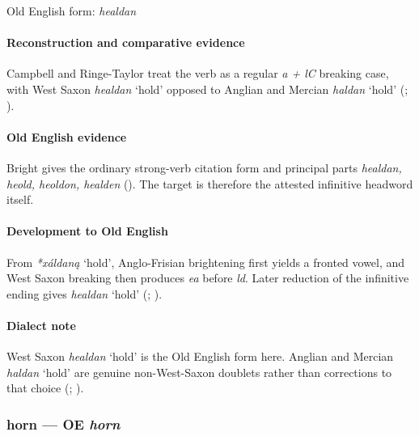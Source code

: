 \documentclass[
  british,
  a4paper,
]{article}
\providecommand{\Recon}[1]{\emph{*#1}}
\begin{document}
Old English form: \emph{healdan}

\paragraph{Reconstruction and comparative
evidence}\label{reconstruction-and-comparative-evidence-34}

Campbell and Ringe-Taylor treat the verb as a regular \emph{a + lC}
breaking case, with West Saxon {\emph{healdan}} `hold' opposed to
Anglian and Mercian {\emph{haldan}} `hold'
(;
).

\paragraph{Old English evidence}\label{old-english-evidence-34}

Bright gives the ordinary strong-verb citation form and principal parts
\emph{healdan, heold, heoldon, healden}
(). The target is
therefore the attested infinitive headword itself.

\paragraph{Development to Old
English}\label{development-to-old-english-34}

From \Recon{xáldaną} `hold', Anglo-Frisian brightening first yields a
fronted vowel, and West Saxon breaking then produces \emph{ea} before
\emph{ld}. Later reduction of the infinitive ending gives
{\emph{healdan}} `hold' (;
).

\paragraph{Dialect note}\label{dialect-note-2}

West Saxon {\emph{healdan}} `hold' is the Old English form here. Anglian
and Mercian {\emph{haldan}} `hold' are genuine non-West-Saxon doublets
rather than corrections to that choice
(;
).

\subsubsection{\texorpdfstring{horn --- OE
\emph{horn}}{horn --- OE horn}}\label{horn-oe-horn}
\end{document}
